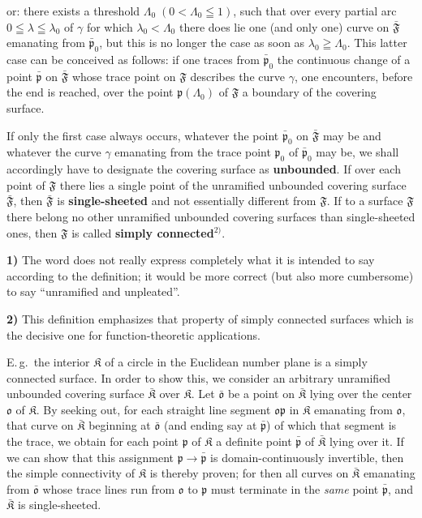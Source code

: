 \documentclass{article}
\begin{document}
or: there exists a threshold $\varLambda_0\;(0 < \varLambda_0 \leqq 1)$, such that over every partial arc $0 \leqq \lambda \leqq \lambda_0$ of $\gamma$ for which $\lambda_0 < \varLambda_0$ there does lie one (and only one) curve on $\bar{\mathfrak{F}}$ emanating from $\bar{\mathfrak{p}}_0$, but this is no longer the case as soon as $\lambda_0 \geqq \varLambda_0$. This latter case can be conceived as follows: if one traces from $\bar{\mathfrak{p}}_0$ the continuous change of a point $\bar{\mathfrak{p}}$ on $\bar{\mathfrak{F}}$ whose trace point on $\mathfrak{F}$ describes the curve $\gamma$, one encounters, before the end is reached, over the point $\mathfrak{p}(\varLambda_0)$ of $\mathfrak{F}$ a boundary of the covering surface.

If only the first case always occurs, whatever the point $\bar{\mathfrak{p}}_0$ on $\bar{\mathfrak{F}}$ may be and whatever the curve $\gamma$ emanating from the trace point $\mathfrak{p}_0$ of $\bar{\mathfrak{p}}_0$ may be, we shall accordingly have to designate the covering surface as \textbf{unbounded}. If over each point of $\mathfrak{F}$ there lies a single point of the unramified unbounded covering surface $\bar{\mathfrak{F}}$, then $\bar{\mathfrak{F}}$ is \textbf{single-sheeted} and not essentially different from $\mathfrak{F}$. If to a surface $\mathfrak{F}$ there belong no other unramified unbounded covering surfaces than single-sheeted ones, then $\mathfrak{F}$ is called \textbf{simply connected}${}^{2)}$.

\textbf{1)} The word does not really express completely what it is intended to say according to the definition; it would be more correct (but also more cumbersome) to say ``unramified and unpleated''.

\textbf{2)} This definition emphasizes that property of simply connected surfaces which is the decisive one for function-theoretic applications.

E.\,g.\ the interior $\mathfrak{K}$ of a circle in the Euclidean number plane is a simply connected surface. In order to show this, we consider an arbitrary unramified unbounded covering surface $\bar{\mathfrak{K}}$ over $\mathfrak{K}$. Let $\bar{\mathfrak{o}}$ be a point on $\bar{\mathfrak{K}}$ lying over the center $\mathfrak{o}$ of $\mathfrak{K}$. By seeking out, for each straight line segment $\mathfrak{o}\mathfrak{p}$ in $\mathfrak{K}$ emanating from $\mathfrak{o}$, that curve on $\bar{\mathfrak{K}}$ beginning at $\bar{\mathfrak{o}}$ (and ending say at $\bar{\mathfrak{p}}$) of which that segment is the trace, we obtain for each point $\mathfrak{p}$ of $\mathfrak{K}$ a definite point $\bar{\mathfrak{p}}$ of $\bar{\mathfrak{K}}$ lying over it. If we can show that this assignment $\mathfrak{p} \to \bar{\mathfrak{p}}$ is domain-continuously invertible, then the simple connectivity of $\mathfrak{K}$ is thereby proven; for then all curves on $\bar{\mathfrak{K}}$ emanating from $\bar{\mathfrak{o}}$ whose trace lines run from $\mathfrak{o}$ to $\mathfrak{p}$ must terminate in the \emph{same} point $\bar{\mathfrak{p}}$, and $\bar{\mathfrak{K}}$ is single-sheeted.
\end{document}
